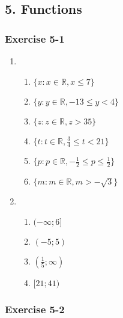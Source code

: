 {\begin{multicols}{3}
\begin{enumerate}[noitemsep, label=\textbf{\arabic*}. ]
\end{enumerate}
\end{multicols}


\subsection* {5. Functions}
\begin{multicols}{3}
\subsubsection*{Exercise 5-1} %

\begin{enumerate}[noitemsep, label=\textbf{\arabic*}. ] 


\item %
\begin{enumerate}[noitemsep, label=\textbf{(\alph*)} ] 
 \item $\{x:x\in\mathbb{R}, x\leq7\}$ %
\item $\{y:y\in\mathbb{R}, -13 \leq y<4\}$ %
\item $\{z:z\in\mathbb{R}, z>35\}$ %
\item $\{t:t\in\mathbb{R}, \frac{3}{4}\leq t <21\}$ %
\item $\{p:p\in\mathbb{R}, -\frac{1}{2}\leq p \leq \frac{1}{2}\}$ %
\item $\{m:m\in\mathbb{R}, m > -\sqrt{3}\}$  %
\end{enumerate}

\item %
\begin{enumerate}[noitemsep, label=\textbf{(\alph*)} ] 
 \item $(-\infty; 6]$ %
 \item $(-5; 5)$ %
 \item $(\frac{1}{5}; \infty)$%
 \item $[21; 41)$%
\end{enumerate}
\end{enumerate}

\subsubsection*{Exercise 5-2} %


\end{multicols}}
